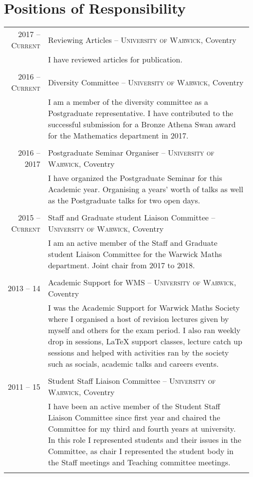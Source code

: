 \documentclass[a4paper,10pt]{article}
\begin{document}
\section{Positions of Responsibility}
\begin{tabular}{r|p{15cm}}
\textsc{2017 -- Current}& Reviewing Articles -- \textsc{University of Warwick}, Coventry\\&\footnotesize{I have reviewed articles for publication.}\\\multicolumn{2}{c}{} \\
\textsc{2016 -- Current}& Diversity Committee -- \textsc{University of Warwick}, Coventry\\&\footnotesize{I am a member of the diversity committee as a Postgraduate representative. I have contributed to the successful submission for a Bronze Athena Swan award for the Mathematics department in 2017.}\\\multicolumn{2}{c}{} \\
\textsc{2016 -- 2017}& Postgraduate Seminar Organiser -- \textsc{University of Warwick}, Coventry\\&\footnotesize{I have organized the Postgraduate Seminar for this Academic year. Organising a years’ worth of talks as well as the Postgraduate talks for two open days.}\\\multicolumn{2}{c}{} \\
\textsc{2015 -- Current}& Staff and Graduate student Liaison Committee -- \textsc{University of Warwick}, Coventry\\&\footnotesize{I am an active member of the Staff and Graduate student Liaison Committee for the Warwick Maths department. Joint chair from 2017 to 2018.}\\\multicolumn{2}{c}{} \\
\textsc{2013 -- 14}& Academic Support for WMS -- \textsc{University of Warwick}, Coventry\\&\footnotesize{I was the Academic Support for Warwick Maths Society where I organised a host of revision lectures given by myself and others for the exam period. I also ran weekly drop in sessions, LaTeX support classes, lecture catch up sessions and helped with activities ran by the society such as socials, academic talks and careers events.}\\\multicolumn{2}{c}{} \\
\textsc{2011 -- 15}& Student Staff Liaison Committee -- \textsc{University of Warwick}, Coventry\\&\footnotesize{I have been an active member of the Student Staff Liaison Committee since first year and chaired the Committee for my third and fourth years at university. In this role I represented students and their issues in the Committee, as chair I represented the student body in the Staff meetings and Teaching committee meetings.}\\\multicolumn{2}{c}{} \\
\end{tabular}
\end{document}
